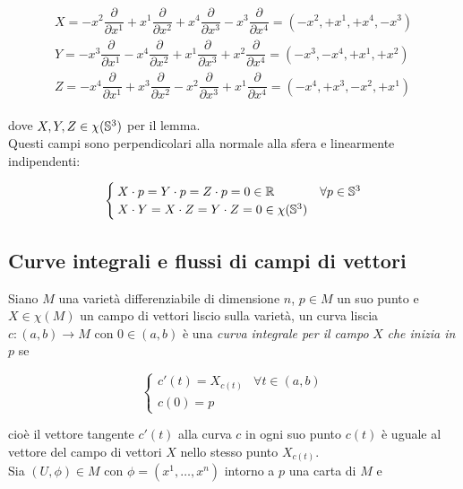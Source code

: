 \begin{align}
	\begin{split}
		X = - x^{2} \dfrac{\partial}{\partial x^{1}} + x^{1} \dfrac{\partial}{\partial x^{2}} + x^{4} \dfrac{\partial}{\partial x^{3}} - x^{3} \dfrac{\partial}{\partial x^{4}} = (-x^{2}, +x^{1}, +x^{4}, -x^{3})\\
		Y = - x^{3} \dfrac{\partial}{\partial x^{1}} - x^{4} \dfrac{\partial}{\partial x^{2}} + x^{1} \dfrac{\partial}{\partial x^{3}} + x^{2} \dfrac{\partial}{\partial x^{4}} = (-x^{3}, -x^{4}, +x^{1}, +x^{2})\\
		Z = - x^{4} \dfrac{\partial}{\partial x^{1}} + x^{3} \dfrac{\partial}{\partial x^{2}} - x^{2} \dfrac{\partial}{\partial x^{3}} + x^{1} \dfrac{\partial}{\partial x^{4}} = (-x^{4}, +x^{3}, -x^{2}, +x^{1})
	\end{split}
\end{align}

dove $ X,Y,Z \in \chi(\S^{3}) $ per il lemma.\\
Questi campi sono perpendicolari alla normale alla sfera e linearmente indipendenti:

\begin{equation}
	\begin{cases}
		X \cdot p = Y \cdot p = Z \cdot p = 0 \in \R & \forall p \in \S^{3}\\
		X \cdot Y = X \cdot Z = Y \cdot Z = 0 \in \chi(\S^{3})
	\end{cases}
\end{equation}

\subsection{Curve integrali e flussi di campi di vettori}

Siano $ M $ una varietà differenziabile di dimensione $ n $, $ p \in M $ un suo punto e $ X \in \chi(M) $ un campo di vettori liscio sulla varietà, un curva liscia $ c : (a,b) \to M $ con $ 0 \in (a,b) $ è una \textit{curva integrale per il campo} $ X $ \textit{che inizia in} $ p $ se

\begin{equation}
	\begin{cases}
		c'(t) = X_{c(t)} & \forall t \in (a,b)\\
		c(0) = p
	\end{cases}
\end{equation}

cioè il vettore tangente $ c'(t) $ alla curva $ c $ in ogni suo punto $ c(t) $ è uguale al vettore del campo di vettori $ X $ nello stesso punto $ X_{c(t)} $.\\
Sia $ (U,\phi) \in M $ con $ \phi = (x^{1},\dots,x^{n}) $ intorno a $ p $ una carta di $ M $ e

